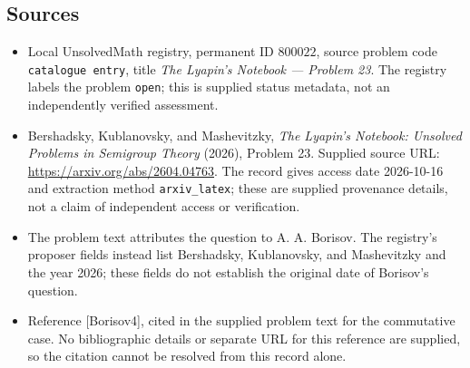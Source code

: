 \documentclass[11pt]{article}
\begin{document}
\subsection{Sources}
\begin{itemize}
\item Local UnsolvedMath registry, permanent ID \(800022\), source problem code \texttt{catalogue entry}, title \emph{The Lyapin's Notebook --- Problem 23}. The registry labels the problem \texttt{open}; this is supplied status metadata, not an independently verified assessment.
\item Bershadsky, Kublanovsky, and Mashevitzky, \emph{The Lyapin's Notebook: Unsolved Problems in Semigroup Theory} (2026), Problem 23. Supplied source URL: \url{https://arxiv.org/abs/2604.04763}. The record gives access date 2026-10-16 and extraction method \texttt{arxiv\_latex}; these are supplied provenance details, not a claim of independent access or verification.
\item The problem text attributes the question to A. A. Borisov. The registry's proposer fields instead list Bershadsky, Kublanovsky, and Mashevitzky and the year 2026; these fields do not establish the original date of Borisov's question.
\item Reference [Borisov4], cited in the supplied problem text for the commutative case. No bibliographic details or separate URL for this reference are supplied, so the citation cannot be resolved from this record alone.
\end{itemize}
\end{document}
